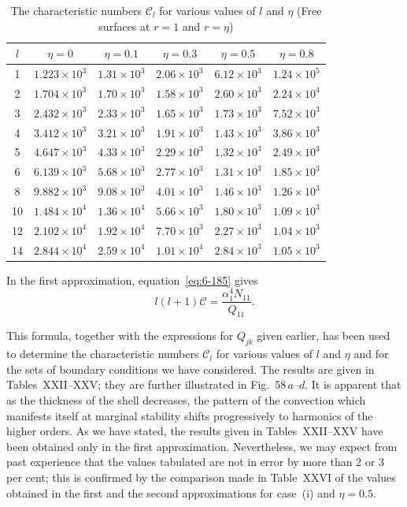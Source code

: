 \begin{table}[ht]
\centering
\caption{The characteristic numbers $\mathcal{C}_l$ for various values of $l$ and $\eta$\newline
(Free surfaces at $r = 1$ and $r = \eta$)}
\label{tab:XXII}
\begin{tabular}{c c c c c c}
\hline
$l$ & $\eta = 0$ & $\eta = 0.1$ & $\eta = 0.3$ & $\eta = 0.5$ & $\eta = 0.8$ \\
\hline
1 & $1.223\times 10^3$ & $1.31\times 10^3$ & $2.06\times 10^3$ & $6.12\times 10^3$ & $1.24\times 10^5$ \\
2 & $1.704\times 10^3$ & $1.70\times 10^3$ & $1.58\times 10^3$ & $2.60\times 10^3$ & $2.24\times 10^4$ \\
3 & $2.432\times 10^3$ & $2.33\times 10^3$ & $1.65\times 10^3$ & $1.73\times 10^3$ & $7.52\times 10^3$ \\
4 & $3.412\times 10^3$ & $3.21\times 10^3$ & $1.91\times 10^3$ & $1.43\times 10^3$ & $3.86\times 10^3$ \\
5 & $4.647\times 10^3$ & $4.33\times 10^3$ & $2.29\times 10^3$ & $1.32\times 10^3$ & $2.49\times 10^3$ \\
6 & $6.139\times 10^3$ & $5.68\times 10^3$ & $2.77\times 10^3$ & $1.31\times 10^3$ & $1.85\times 10^3$ \\
8 & $9.882\times 10^3$ & $9.08\times 10^3$ & $4.01\times 10^3$ & $1.46\times 10^3$ & $1.26\times 10^3$ \\
10 & $1.484\times 10^4$ & $1.36\times 10^4$ & $5.66\times 10^3$ & $1.80\times 10^3$ & $1.09\times 10^3$ \\
12 & $2.102\times 10^4$ & $1.92\times 10^4$ & $7.70\times 10^3$ & $2.27\times 10^3$ & $1.04\times 10^3$ \\
14 & $2.844\times 10^4$ & $2.59\times 10^4$ & $1.01\times 10^4$ & $2.84\times 10^3$ & $1.05\times 10^3$ \\
\hline
\end{tabular}
\end{table}

In the first approximation, equation~\eqref{eq:6-185} gives
\begin{equation}\label{eq:6-186}
l(l+1)\mathcal{C} = \frac{\alpha_1^4 N_{11}}{Q_{11}}.
\end{equation}

This formula, together with the expressions for $Q_{jk}$ given earlier, has
been used to determine the characteristic numbers $\mathcal{C}_l$ for various values
of $l$ and $\eta$ and for the sets of boundary conditions we have considered.
The results are given in Tables~XXII--XXV; they are further illustrated
in Fig.~58\,$a$--$d$. It is apparent that as the thickness of the shell
decreases, the pattern of the convection which manifests itself at
marginal stability shifts progressively to harmonics of the higher orders.
As we have stated, the results given in Tables~XXII--XXV have been
obtained only in the first approximation. Nevertheless, we may expect
from past experience that the values tabulated are not in error by more
than 2 or 3 per cent; this is confirmed by the comparison made in
Table~XXVI of the values obtained in the first and the second approxi\-mations for case~(i) and $\eta = 0.5$.

